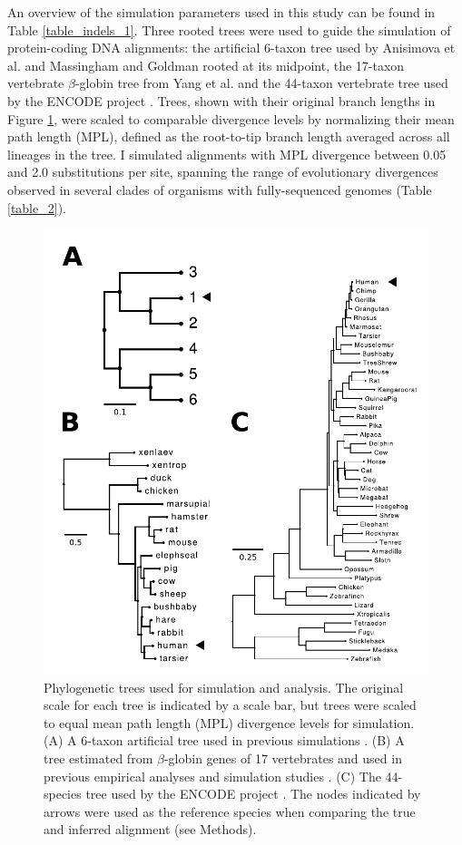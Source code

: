An overview of the simulation parameters used in this study can be
found in Table \ref{table_indels_1}. Three rooted trees were used to guide
the simulation of protein-coding DNA alignments: the artificial
6-taxon tree used by Anisimova et al.
\citeyearpar{Anisimova2001} and Massingham and Goldman
\citeyearpar{Massingham2005Detecting} rooted at its midpoint, the
17-taxon vertebrate $\beta$-globin tree from Yang et
al. \citeyearpar{Yang2000CodonSubstitution} and the 44-taxon
vertebrate tree used by the ENCODE project
\citep{Birney2007,Nikolaev2007}. Trees, shown with their
original branch lengths in Figure \ref{fig_1}, were scaled to
comparable divergence levels by normalizing their mean path length
(MPL), defined as the root-to-tip branch length averaged across all
lineages in the tree. I simulated alignments with MPL divergence
between 0.05 and 2.0 \syn substitutions per \syn site,
spanning the range of evolutionary divergences observed in several
clades of organisms with fully-sequenced genomes (Table
\ref{table_2}).
\begin{figure}[t!]
\centering
\includegraphics[scale=0.6]{Figs/fig1.pdf}
\caption{Phylogenetic trees used for simulation and analysis. The
  original scale for each tree is indicated by a scale bar, but trees
  were scaled to equal mean path length (MPL) divergence levels for
  simulation. (A) A 6-taxon artificial tree used in previous
  simulations
  \citep{Anisimova2001,Massingham2005}. (B) A tree
  estimated from $\beta$-globin genes of 17 vertebrates and used in
  previous empirical analyses and simulation studies
  \citep{Anisimova2001,Anisimova2002}. (C) The
  44-species tree used by the ENCODE project
  \citep{Birney2007,Nikolaev2007}. The nodes indicated by
  arrows were used as the reference species when comparing the true
  and inferred alignment (see Methods).}
\label{fig_1}
\end{figure}

